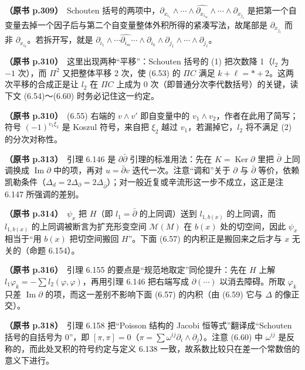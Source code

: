 \noindent \textbf{（原书 p.309）}\ Schouten 括号的两项中，$\partial_{x_{i_1}}\wedge\cdots\wedge\widehat{\partial_{x_{i_m}}}\wedge\cdots\wedge\partial_{x_{j_\ell}}$ 是把第一个自变量去掉一个因子后与第二个自变量整体外积所得的紧凑写法，故尾部是 $\partial_{x_{j_\ell}}$ 而非 $\partial_{x_{i_k}}$。若拆开写，就是 $\partial_{i_1}\wedge\cdots\widehat{\partial_{i_m}}\cdots\wedge\partial_{i_k}\wedge\partial_{j_1}\wedge\cdots\wedge\partial_{j_\ell}$。\par\smallskip

\noindent \textbf{（原书 p.310）}\ 这里出现两种“平移”：Schouten 括号的 (1) 把次数降 1（$l_2$ 为 $-1$ 次），而 $\Pi^2$ 又把整体平移 2 次，使 (6.53) 的 $\Pi C$ 满足 $k+\ell=*+2$。这两次平移的合成正是让 $l_2$ 在 $\Pi C$ 上成为 0 次（即普通分次李代数括号）的关键，读下文 (6.54)～(6.60) 时务必记住这一约定。\par\smallskip

\noindent \textbf{（原书 p.310）}\ (6.55) 右端的 $v\wedge v'$ 即自变量中的 $v_1\wedge v_2$，作者在此用了简写；符号 $(-1)^{v_1\xi_2}$ 是 Koszul 符号，来自把 $\xi_2$ 越过 $v_1$，若漏掉它，$l_2$ 将不满足 (2) 的分次对称性。\par\smallskip

\noindent \textbf{（原书 p.313）}\ 引理 6.146 是 $\partial\bar\partial$ 引理的标准用法：先在 $K=\operatorname{Ker}\partial$ 里把 $\bar\partial$ 上同调换成 $\operatorname{Im}\partial$ 中的项，再对 $u=\bar\partial v$ 迭代一次。注意“调和”关于 $\partial$ 与 $\bar\partial$ 等价，依赖凯勒条件（$\Delta_d=2\Delta_\partial=2\Delta_{\bar\partial}$）；对一般近复或辛流形这一步不成立，这正是注 6.147 所强调的差别。\par\smallskip

\noindent \textbf{（原书 p.314）}\ $\psi_x$ 把 $H$（即 $l_1=\bar\partial$ 的上同调）送到 $l_{1,b(x)}$ 的上同调，而 $l_{1,b(x)}$ 的上同调被断言为扩充形变空间 $\mathcal{M}(M)$ 在 $b(x)$ 处的切空间，因此 $\psi_x$ 相当于“用 $b(x)$ 把切空间搬回 $H$”。下面 (6.57) 的内积正是搬回来之后才与 $x$ 无关的（命题 6.154）。\par\smallskip

\noindent \textbf{（原书 p.316）}\ 引理 6.155 的要点是“规范地取定”同伦提升：先在 $H$ 上解 $l_1\varphi_k=-\sum l_2(\varphi,\varphi)$，再用引理 6.146 把右端写成 $\partial(\cdots)$ 以消去障碍。所取 $\varphi_k$ 只差 $\operatorname{Im}\partial$ 的项，而这一差别不影响下面 (6.57) 的内积（由 (6.59) 它与 $\Delta$ 的像正交）。\par\smallskip

\noindent \textbf{（原书 p.318）}\ 引理 6.158 把“Poisson 结构的 Jacobi 恒等式”翻译成“Schouten 括号的自括号为 0”，即 $[\pi,\pi]=0$（$\pi=\sum\omega^{ij}\partial_i\wedge\partial_j$）。注意 (6.60) 中 $\omega^{ij}$ 是反称的，而此处叉积的符号约定与定义 6.138 一致，故系数比较只在差一个常数倍的意义下进行。\par\smallskip


